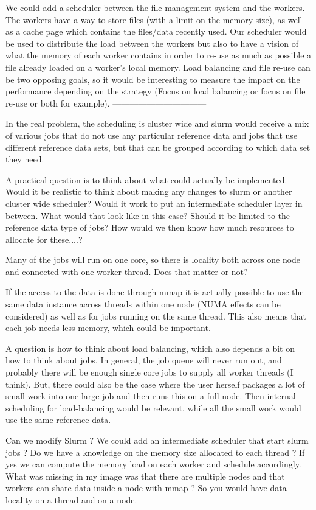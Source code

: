 \documentclass[a4paper]{article}
\begin{document}
We could add a scheduler between the file management system and the workers.
The workers have a way to store files (with a limit on the memory size), as well as a cache page which contains the files/data recently used.
Our scheduler would be used to distribute the load between the workers
but also to have a vision of what the memory of each worker contains in order to re-use as much as possible a file already loaded on a worker's local memory.
Load balancing and file re-use can be two opposing goals, so it would be interesting to measure the impact on the performance depending on the strategy (Focus on load balancing or focus on file re-use or both for example).
---------------------------------

In the real problem, the scheduling is cluster wide and slurm would receive a mix of various jobs that do not use any particular reference data and jobs that use different reference data sets, but that can be grouped according to which data set they need.

A practical question is to think about what could actually be implemented. Would it be realistic to think about making any changes to slurm or another cluster wide scheduler? Would it work to put an intermediate scheduler layer in between. What would that look like in this case? Should it be limited to the reference data type of jobs? How would we then know how much resources to allocate for these....?

Many of the jobs will run on one core, so there is locality both across one node and connected with one worker thread. Does that matter or not?

If the access to the data is done through mmap it is actually possible to use the same data instance across threads within one node (NUMA effects can be considered) as well as for jobs running on the same thread. This also means that each job needs less memory, which could be important.

A question is how to think about load balancing, which also depends a bit on how to think about jobs. In general, the job queue will never run out, and probably there will be enough single core jobs to supply all worker threads (I think). But, there could also be the case where the user herself packages a lot of small work into one large job and then runs this on a full node. Then internal scheduling for load-balancing would be relevant, while all the small work would use the same reference data.
---------------------------------

Can we modify Slurm ? We could add an intermediate scheduler that start slurm jobs ?
Do we have a knowledge on the memory size allocated to each thread ? If yes we can compute the memory load on each worker and 
schedule accordingly.
What was missing in my image was that there are multiple nodes and that workers can share data inside a node with mmap ?
So you would have data locality on a thread and on a node.
---------------------------------
\end{document}
